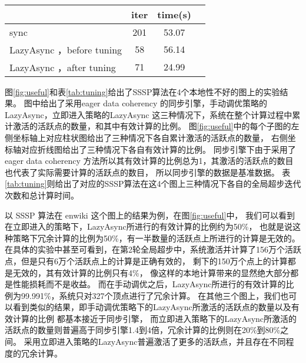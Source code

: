 \begin{table}[!htbp]
\begin{subtable}[t]{0.45\textwidth}
\begin{tabular}{lccc}
          \hline
      \end{tabular}
  \end{subtable}
  ~%
  \begin{subtable}[t]{0.45\textwidth}
      \centering
      \label{tab:sample_4}
      \begin{tabular}{lccc}
          \hline
          & iter  & time(s) \\
          \hline
          sync & 201 & 53.07 \\
          \hline
          LazyAsync ，before tuning & 58 & {\color{red}56.14} \\
          \hline
          LazyAsync ，after tuning & 71 & 24.99 \\
          \hline
      \end{tabular}
  \end{subtable}
\end{table}
图\ref{fig:useful}和表\ref{tab:tuning}给出了SSSP算法在4个本地性不好的图上的实验结果。
图中给出了采用eager data coherency 的同步引擎，手动调优策略的LazyAsync，立即进入策略的LazyAsync
这三种情况下，系统在整个计算过程中累计激活的活跃点的数量，和其中有效计算的比例。
图\ref{fig:useful}中的每个子图的左侧坐标轴上对应柱状图给出了三种情况下各自累计激活的活跃点的数量，
右侧坐标轴对应折线图给出了三种情况下各自有效计算的比例。
同步引擎下由于采用了eager data coherency 方法所以其有效计算的比例总为1，其激活的活跃点的数目也代表了实际需要计算的活跃点的数目，
所以同步引擎的数据是基准数据。
表\ref{tab:tuning}则给出了对应的SSSP算法在这4个图上三种情况下各自的全局超步迭代次数和总计算时间。

以 SSSP 算法在 enwiki 这个图上的结果为例，在图\ref{fig:useful}中，
我们可以看到在立即进入的策略下，LazyAsync所进行的有效计算的比例约为50\%，
也就是说这种策略下冗余计算的比例为50\%，有一半数量的活跃点上所进行的计算是无效的。
在具体的实验中甚至可看到，在第2轮全局超步中，系统激活并计算了156万个活跃点，但是只有6万个活跃点上的计算是正确有效的，
剩下的150万个点上的计算都是无效的，其有效计算的比例只有4\%，
像这样的本地计算带来的显然绝大部分都是性能损耗而不是收益。
而在手动调优之后，LazyAsync所进行的有效计算的比例为99.991\%，系统只对327个顶点进行了冗余计算。
在其他三个图上，我们也可以看到类似的结果，即手动调优策略下的LazyAsync所激活的活跃点的数量以及有效计算的比例
都基本接近于同步引擎，
而立即进入策略下的LazyAsync所激活的活跃点的数量则普遍高于同步引擎1.4到4倍，冗余计算的比例则在20\%到80\%之间。
采用立即进入策略的LazyAsync普遍激活了更多的活跃点，并且存在不同程度的冗余计算。

